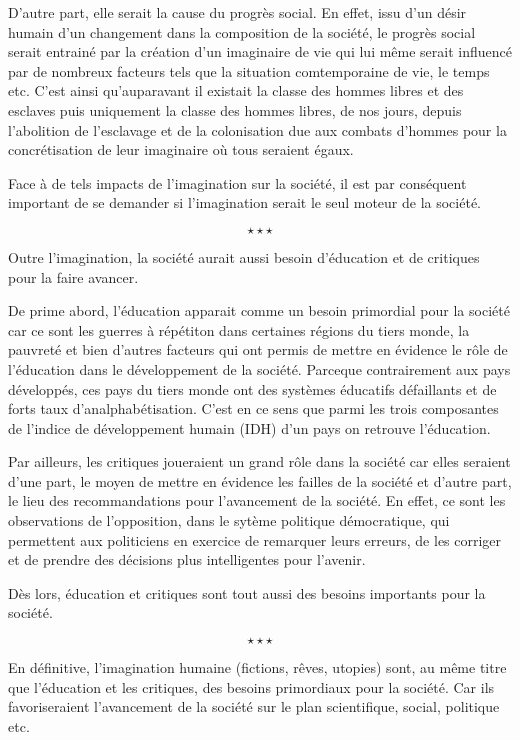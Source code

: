D'autre part, elle serait la cause du progrès social. En effet, issu d'un désir humain d'un changement dans la composition de la société, le progrès social serait entrainé par la création d'un imaginaire de vie qui lui même serait influencé par de nombreux facteurs tels que la situation comtemporaine de vie, le temps etc. C'est ainsi qu'auparavant il existait la classe des hommes libres et des esclaves puis uniquement la classe des hommes libres, de nos jours, depuis l'abolition de l'esclavage et de la colonisation due aux combats d'hommes pour la concrétisation de leur imaginaire où tous seraient égaux.

Face à de tels impacts de l'imagination sur la société, il est par conséquent important de se demander si l'imagination serait le seul moteur de la société.

$$\star \star \star$$

Outre l'imagination, la société aurait aussi besoin d'éducation et de critiques pour la faire avancer.

De prime abord, l'éducation apparait comme un besoin primordial pour la société car ce sont les guerres à répétiton dans certaines régions du tiers monde, la pauvreté et bien d'autres facteurs qui ont permis de mettre en évidence le rôle de l'éducation dans le développement de la société. Parceque contrairement aux pays développés, ces pays du tiers monde ont des systèmes éducatifs défaillants et de forts taux d'analphabétisation. C'est en ce sens que parmi les trois composantes de l'indice de développement humain (IDH) d'un pays on retrouve l'éducation.

Par ailleurs, les critiques joueraient un grand rôle dans la société car elles seraient d'une part, le moyen de mettre en évidence les failles de la société et d'autre part, le lieu des recommandations pour l'avancement de la société. En effet, ce sont les observations de l'opposition, dans le sytème politique démocratique, qui permettent aux politiciens en exercice de remarquer leurs erreurs, de les corriger et de prendre des décisions plus intelligentes pour l'avenir.

Dès lors, éducation et critiques sont tout aussi des besoins importants pour la société.

$$\star \star \star$$

En définitive, l'imagination humaine (fictions, rêves, utopies) sont, au même titre que l'éducation et les critiques, des besoins primordiaux pour la société. Car ils favoriseraient l'avancement de la société sur le plan scientifique, social, politique etc.

